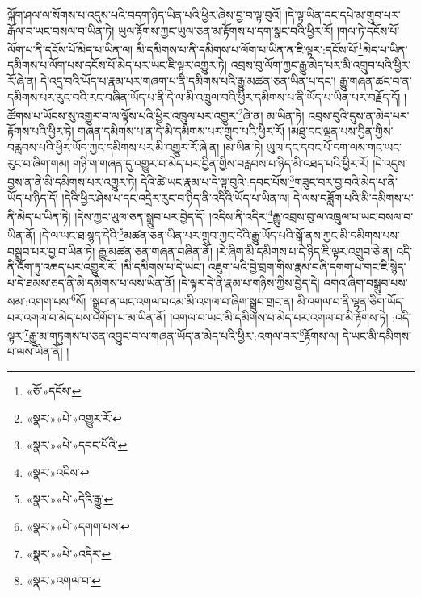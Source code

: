 ལྐོག་ཤལ་ལ་སོགས་པ་འདུས་པའི་བདག་ཉིད་ཡིན་པའི་ཕྱིར་ཞེས་བྱ་བ་ལྟ་བུའོ། །དེ་ལྟ་ཡིན་དང་དཔེ་མ་གྲུབ་པར་རྒོལ་བ་ཡང་བསལ་བ་ཡིན་ཏེ། ཡུལ་རྟོགས་ཀྱང་ཡུལ་ཅན་མ་རྟོགས་པ་དག་སྣང་བའི་ཕྱིར་རོ། །གལ་ཏེ་དངོས་པོ་ལོག་པ་ནི་དངོས་པོ་མེད་པ་ཡིན་ལ། མི་དམིགས་པ་ནི་དམིགས་པ་ལོག་པ་ཡིན་ན་ཇི་ལྟར་:དངོས་པོ་\footnote{«ཅོ་»དངོས་}མེད་པ་ཡིན་དམིགས་པ་ལོག་པས་དངོས་པོ་མེད་པར་ཡང་ཇི་ལྟར་འགྱུར་ཏེ། འབྲས་བུ་ལོག་ཀྱང་རྒྱུ་མེད་པར་མི་འགྲུབ་པའི་ཕྱིར་རོ་ཞེ་ན། དེ་འདྲ་བའི་ཡོད་པ་རྣམ་པར་གཞག་པ་ནི་དམིགས་པའི་རྒྱུ་མཚན་ཅན་ཡིན་པ་དང་། རྒྱུ་གཞན་ཚང་བ་ན་དམིགས་པར་རུང་བའི་རང་བཞིན་ཡོད་པ་ནི་དེ་ལ་མི་འཁྲུལ་བའི་ཕྱིར་དམིགས་པ་ནི་ཡོད་པ་ཡིན་པར་བརྗོད་དོ། །ཚོགས་པ་ཡོངས་སུ་འགྱུར་བ་ལ་ལྟོས་པའི་ཕྱིར་འཁྲུལ་པར་འགྱུར་\footnote{«སྣར་»«པེ་»འགྱུར་རོ་}ཞེ་ན། མ་ཡིན་ཏེ། འབྲས་བུའི་དུས་ན་མེད་པར་རྟོགས་པའི་ཕྱིར་ཏེ། གཞན་དམིགས་པ་ན་དེ་མི་དམིགས་པར་གྲུབ་པའི་ཕྱིར་རོ། །མཐུ་དང་ལྡན་པས་བྱིན་གྱིས་བརླབས་པའི་ཕྱིར་ཡོད་ཀྱང་དམིགས་པར་མི་འགྱུར་རོ་ཞེ་ན། །མ་ཡིན་ཏེ། ཡུལ་དང་དབང་པོ་དག་ལས་གང་ཡང་རུང་བ་ཞིག་གམ། གཉི་ག་གཞན་དུ་འགྱུར་བ་མེད་པར་བྱིན་གྱིས་བརླབས་པ་ཉིད་མི་འཐད་པའི་ཕྱིར་རོ། །དེ་འདུས་བྱས་ན་ནི་མི་དམིགས་པར་འགྱུར་ཏེ། དེའི་ཚེ་ཡང་རྣམ་པ་དེ་ལྟ་བུའི་:དབང་པོས་\footnote{«སྣར་»«པེ་»དབང་པོའི་}གཟུང་བར་བྱ་བའི་མེད་པ་ནི་ཡོད་པ་ཉིད་དོ། །དེའི་ཕྱིར་ཤེས་པ་དང་འདྲེར་རུང་བ་ཉིད་ནི་འདིའི་ཡོད་པ་ཡིན་ལ། དེ་ལས་བཟློག་པའི་མི་དམིགས་པ་ནི་མེད་པ་ཡིན་ཏེ། །དེས་ཀྱང་ཡུལ་ཅན་སྒྲུབ་པར་བྱེད་དོ། །འདིས་ནི་འདིར་\footnote{«སྣར་»འདིས་}རྒྱུ་འབྲས་བུ་ལ་འཁྲུལ་པ་ཡང་བསལ་བ་ཡིན་ནོ། །དེ་ལ་ཡང་ཐ་སྙད་དེའི་\footnote{«སྣར་»«པེ་»དེའི་རྒྱུ་}མཚན་ཅན་ཡིན་པར་གྲུབ་ཀྱང་དེའི་རྒྱུ་ཡོད་པའི་སྒོ་ནས་ཀྱང་མི་དམིགས་པས་བསྒྲུབ་པར་བྱ་བ་ཡིན་ཏེ། རྒྱུ་མཚན་ཅན་གཞན་བཞིན་ནོ། །རེ་ཞིག་མི་དམིགས་པ་དེ་ཉིད་ཇི་ལྟར་འགྲུབ་ཅེ་ན། འདི་ནི་འོག་ཏུ་འཆད་པར་འགྱུར་རོ། །མི་དམིགས་པ་དེ་ཡང་། འཇུག་པའི་བྱེ་བྲག་གིས་རྣམ་བཞི་དགག་པ་གང་ཇི་སྙེད་པ་དེ་ཐམས་ཅད་ནི་མི་དམིགས་པ་ལས་ཡིན་ནོ། །དེ་ལྟར་དེ་ནི་རྣམ་པ་གཉིས་ཀྱིས་བྱེད་དེ། འགའ་ཞིག་བསྒྲུབ་པས་སམ་:འགག་པས་\footnote{«སྣར་»«པེ་»དགག་པས་}སོ། །སྒྲུབ་ན་ཡང་འགལ་བའམ་མི་འགལ་བ་ཞིག་སྒྲུབ་གྲང་ན། མི་འགལ་བ་ནི་ལྷན་ཅིག་ཡོད་པར་འགལ་བ་མེད་པས་འགོག་པ་མ་ཡིན་ནོ། །འགལ་བ་ཡང་མི་དམིགས་པ་མེད་པར་འགལ་བ་མི་རྟོགས་ཏེ། :འདི་ལྟར་\footnote{«སྣར་»«པེ་»འདིར་}རྒྱུ་མ་གཏུགས་པ་ཅན་འབྱུང་བ་ལ་གཞན་ཡོད་ན་མེད་པའི་ཕྱིར་:འགལ་བར་\footnote{«སྣར་»འགལ་བ་}རྟོགས་ལ། དེ་ཡང་མི་དམིགས་པ་ལས་ཡིན་ནོ། །
